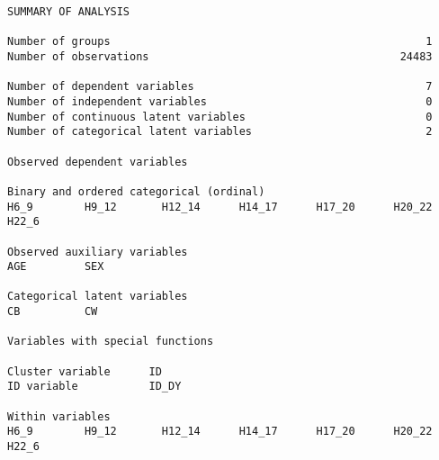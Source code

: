 \begin{verbatim}
SUMMARY OF ANALYSIS

Number of groups                                                 1
Number of observations                                       24483

Number of dependent variables                                    7
Number of independent variables                                  0
Number of continuous latent variables                            0
Number of categorical latent variables                           2

Observed dependent variables

Binary and ordered categorical (ordinal)
H6_9        H9_12       H12_14      H14_17      H17_20      H20_22
H22_6

Observed auxiliary variables
AGE         SEX

Categorical latent variables
CB          CW

Variables with special functions

Cluster variable      ID
ID variable           ID_DY

Within variables
H6_9        H9_12       H12_14      H14_17      H17_20      H20_22
H22_6



\end{verbatim}
